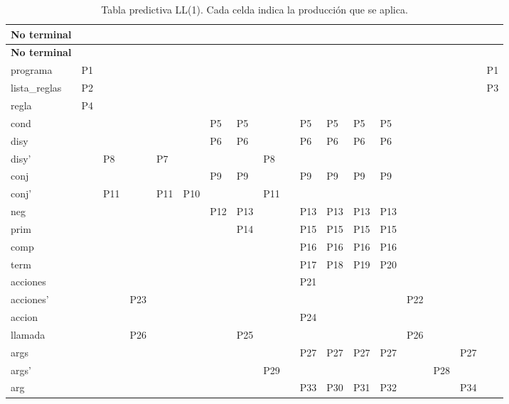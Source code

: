 {\scriptsize\setlength{\tabcolsep}{3.4pt}\begin{longtable}{L{1.7cm}C{0.98cm}C{0.98cm}C{0.98cm}C{0.98cm}C{0.98cm}C{0.98cm}C{0.98cm}C{0.98cm}C{0.98cm}C{0.98cm}C{0.98cm}C{0.98cm}C{0.98cm}C{0.98cm}C{0.98cm}C{0.98cm}C{0.98cm}}
\caption{Tabla predictiva LL(1). Cada celda indica la producción que se aplica.}\label{tab:ll1}\\
\toprule\textbf{No terminal}&&&&&&&&&&&&&&&&&\\\midrule\endfirsthead
\toprule\textbf{No terminal}&&&&&&&&&&&&&&&&&\\\midrule\endhead
programa&P1&&&&&&&&&&&&&&&&P1\\
lista\_reglas&P2&&&&&&&&&&&&&&&&P3\\
regla&P4&&&&&&&&&&&&&&&&\\
cond&&&&&&P5&P5&&&P5&P5&P5&P5&&&&\\
disy&&&&&&P6&P6&&&P6&P6&P6&P6&&&&\\
disy'&&P8&&P7&&&&P8&&&&&&&&&\\
conj&&&&&&P9&P9&&&P9&P9&P9&P9&&&&\\
conj'&&P11&&P11&P10&&&P11&&&&&&&&&\\
neg&&&&&&P12&P13&&&P13&P13&P13&P13&&&&\\
prim&&&&&&&P14&&&P15&P15&P15&P15&&&&\\
comp&&&&&&&&&&P16&P16&P16&P16&&&&\\
term&&&&&&&&&&P17&P18&P19&P20&&&&\\
acciones&&&&&&&&&&P21&&&&&&&\\
acciones'&&&P23&&&&&&&&&&&P22&&&\\
accion&&&&&&&&&&P24&&&&&&&\\
llamada&&&P26&&&&P25&&&&&&&P26&&&\\
args&&&&&&&&&&P27&P27&P27&P27&&&P27&\\
args'&&&&&&&&P29&&&&&&&P28&&\\
arg&&&&&&&&&&P33&P30&P31&P32&&&P34&\\
\bottomrule\end{longtable}}
